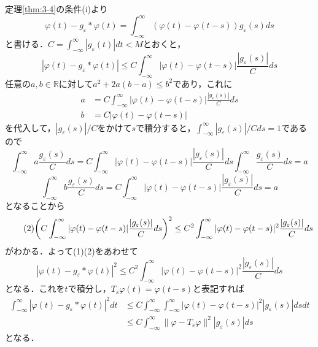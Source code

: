 \documentclass[dvipdfmx,a4j,10pt]{jsarticle}
\makeatletter
\theoremstyle{mystyle1}
\theoremstyle{mystyle3}
\theoremstyle{mystyle4}
\theoremstyle{mystyle6}
\theoremstyle{mystyle2}
\theoremstyle{mystyle5}
\renewenvironment{proof}[1][\proofname]{\par
  \pushQED{\qed}%
  \normalfont
  \topsep6\p@\@plus6\p@ \trivlist
  \item[\hskip\labelsep{\bfseries\sffamily #1}]\ignorespaces
}{%
  \popQED\endtrivlist\@endpefalse
}
\renewcommand\proofname{証明}
\makeatother
\begin{document}
\begin{proof}
	定理\ref{thm:3-4}の条件(i)より
	\[
		\varphi(t)-g_\varepsilon*\varphi(t)=\int_{-\infty}^\infty (\varphi(t)-\varphi(t-s))	g_\varepsilon(s)ds
	\]
	と書ける．$C=\int_{-\infty}^\infty |g_\varepsilon(t)|dt<M$とおくと，
	\begin{equation}\tag{1}
		|\varphi(t)-g_\varepsilon*\varphi(t)|\leq C\int_{-\infty}^\infty|\varphi(t)-\varphi(t-s)|\frac{|g_\varepsilon(s)|}{C}ds
	\end{equation}
	任意の$a,b\in\mathbb{R}$に対して$a^2+2a(b-a)\leq b^2$であり，これに
	\[
		\begin{split}
			a&=C\int_{-\infty}^\infty|\varphi(t)-\varphi(t-s)|\frac{|g_\varepsilon(s)|}{C}ds \\
			b&=C|\varphi(t)-\varphi(t-s)|
		\end{split}
	\]
	を代入して，$|g_\varepsilon(s)|/C$をかけて$s$で積分すると，$\int_{-\infty}^{\infty} |g_\varepsilon(s)|/C ds=1$であるので
	\[
		\int_{-\infty}^\infty a \frac{g_\varepsilon(s)}{C}ds=C\int_{-\infty}^\infty|\varphi(t)-\varphi(t-s)|\frac{|g_\varepsilon(s)|}{C}ds\int_{-\infty}^\infty \frac{g_\varepsilon(s)}{C}ds=a
	\]
	\[
		\int_{-\infty}^\infty b \frac{g_\varepsilon(s)}{C}ds=C\int_{-\infty}^\infty|\varphi(t)-\varphi(t-s)|\frac{|g_\varepsilon(s)|}{C}ds=a
	\]
	となることから
	\begin{equation}\tag{2}
		\mleft(C\int_{-\infty}^\infty|\varphi(t)-\varphi(t-s)|\frac{|g_\varepsilon(s)|}{C}ds\mright)^2\leq C^2\int_{-\infty}^\infty |\varphi(t)-\varphi(t-s)|^2\frac{|g_\varepsilon(s)|}{C}ds
	\end{equation}
	がわかる．よって(1)(2)をあわせて
	\[
		|\varphi(t)-g_\varepsilon*\varphi(t)|^2\leq C^2\int_{-\infty}^\infty |\varphi(t)-\varphi(t-s)|^2\frac{|g_\varepsilon(s)|}{C}ds
	\]
	となる．これを$t$で積分し，$T_s\varphi(t)=\varphi(t-s)$と表記すれば
	\begin{equation}\tag{3}
		\begin{split}
			\int_{-\infty}^\infty |\varphi(t)-g_\varepsilon*\varphi(t)|^2 dt
			&\leq C\int_{-\infty}^\infty \int_{-\infty}^\infty |\varphi(t)-\varphi(t-s)|^2 |g_\varepsilon(s)| dsdt \\
			&\leq C\int_{-\infty}^\infty \|\varphi-T_s\varphi\|^2|g_\varepsilon(s)|ds
		\end{split}
	\end{equation}
	となる．


\end{proof}
\end{document}
